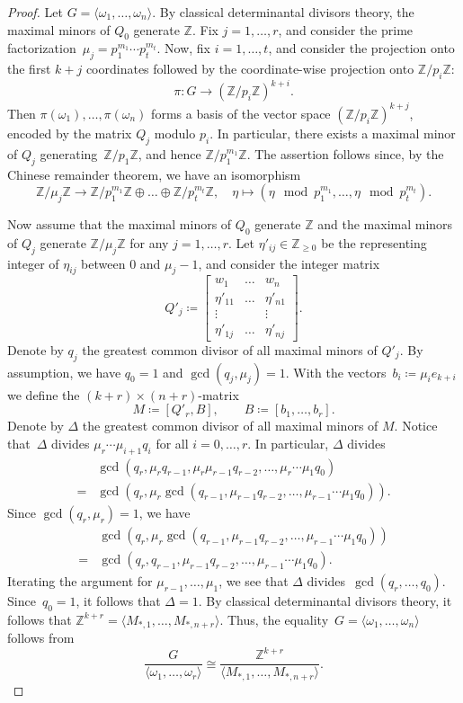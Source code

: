 \documentclass{amsart}
\newcommand{\Z}{\mathbb{Z}}
\theoremstyle{definition}
\begin{document}
\begin{proof}
    Let $G=\langle \omega_1,\dots,\omega_n\rangle$. By classical determinantal divisors theory, the maximal minors of $Q_0$ generate $\Z$. Fix $j=1,\dots,r$, and consider the prime factorization~$\mu_j=p_1^{m_1}\cdots p_t^{m_t}$. Now, fix $i=1,\dots,t$, and consider the projection onto the first $k+j$ coordinates followed by the coordinate-wise projection onto $\Z/p_i\Z$:
    $$
    \pi\colon G\rightarrow(\Z/p_i\Z)^{k+i}.
    $$
    Then $\pi(\omega_1),\dots,\pi(\omega_n)$ forms a basis of the vector space $(\Z/p_i\Z)^{k+j}$, encoded by the matrix $Q_j$ modulo $p_i$. In particular, there exists a maximal minor of $Q_j$ generating~$\Z/p_1\Z$, and hence $\Z/p_1^{m_1}\Z$. The assertion follows since, by the Chinese remainder theorem, we have an isomorphism
    $$
    \Z/\mu_j\Z\rightarrow\Z/{p_1^{m_1}}\Z\oplus\dots\oplus\Z/p_t^{m_t}\Z, \quad     \eta\mapsto(\eta\mod p_1^{m_1},\dots,\eta\mod p_t^{m_t}).
    $$
    
    Now assume that the maximal minors of $Q_0$ generate $\Z$ and the maximal minors of $Q_j$ generate $\Z/\mu_j\Z$ for any $j=1,\dots,r$.
    Let $\eta'_{ij}\in\Z_{\geq 0}$ be the representing integer of  $\eta_{ij}$ between $0$ and $\mu_j-1$, and consider the integer matrix
    $$
    Q'_j\coloneqq \begin{bmatrix}
        w_1 &\dots &w_n\\
        \eta'_{11} & \dots & \eta'_{n1}\\
        \vdots & & \vdots\\
        \eta'_{1j} & \dots & \eta'_{nj}
    \end{bmatrix}.
    $$
    Denote by $q_j$ the greatest common divisor of all maximal minors of $Q'_j$. By assumption, we have $q_0=1$ and $\gcd(q_j,\mu_j)=1$.
    With the vectors~$b_i\coloneqq\mu_i e_{k+i}$ we define the $(k+r)\times(n+r)$-matrix
    $$
    M\coloneqq[Q'_r,B],\qquad B\coloneqq[b_1,\dots,b_r].
    $$
    Denote by $\Delta$ the greatest common divisor of all maximal minors of $M$. Notice that~$\Delta$ divides $\mu_r\cdots\mu_{i+1}q_{i}$ for all $i=0,\dots,r$.
    In particular, $\Delta$ divides \begin{align*}
        &\gcd(q_r,\mu_r q_{r-1},\mu_r\mu_{r-1}q_{r-2},\dots,\mu_r\cdots\mu_1q_0)\\
        =&\gcd(q_r,\mu_r\gcd(q_{r-1},\mu_{r-1}q_{r-2},\dots,\mu_{r-1}\cdots\mu_1q_0)).
    \end{align*}
    Since $\gcd(q_r,\mu_r)=1$, we have
    \begin{align*}
    &\gcd(q_r,\mu_r\gcd(q_{r-1},\mu_{r-1}q_{r-2},\dots,\mu_{r-1}\cdots\mu_1q_0))\\
    =&\gcd(q_r,q_{r-1},\mu_{r-1}q_{r-2},\dots,\mu_{r-1}\cdots\mu_1q_0).
    \end{align*}
    Iterating the argument for $\mu_{r-1},\dots,\mu_1$, we see that $\Delta$ divides~$\gcd(q_r,\dots,q_0)$. Since~$q_0=1$, it follows that $\Delta=1$. By classical determinantal divisors theory, it follows that
    $\Z^{k+r}=\langle M_{*,1},\dots,M_{*,n+r}\rangle$. Thus, the equality~$G=\langle \omega_1,\dots,\omega_n\rangle$ follows from
    $$
    \dfrac{G}{\langle \omega_1,\dots,\omega_r\rangle}\cong\dfrac{\Z^{k+r}}{\langle M_{*,1},\dots,M_{*,n+r}\rangle}.
    $$
    

\end{proof}
\end{document}
